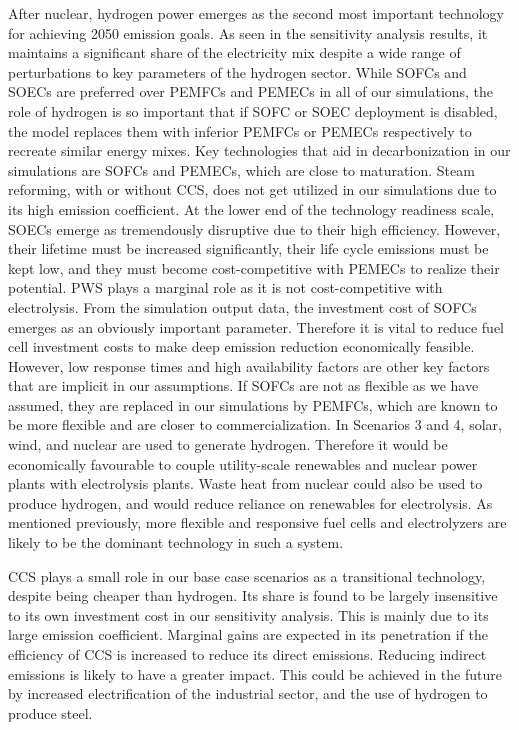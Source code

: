 After nuclear, hydrogen power emerges as the second most important technology for achieving 2050 emission goals. As seen in the sensitivity analysis results, it maintains a significant share of the electricity mix despite a wide range of perturbations to key parameters of the hydrogen sector. While \gls{SOFC}s and \gls{SOEC}s are preferred over \gls{PEMFC}s and \gls{PEMEC}s in all of our simulations, the role of hydrogen is so important that if \gls{SOFC} or \gls{SOEC} deployment is disabled, the model replaces them with inferior \gls{PEMFC}s or \gls{PEMEC}s respectively to recreate similar energy mixes. Key technologies that aid in decarbonization in our simulations are \gls{SOFC}s and \gls{PEMEC}s, which are close to maturation. Steam reforming, with or without CCS, does not get utilized in our simulations due to its high emission coefficient. At the lower end of the technology readiness scale, \gls{SOEC}s emerge as tremendously disruptive due to their high efficiency. However, their lifetime must be increased significantly, their life cycle emissions must be kept low, and they must become cost-competitive with \gls{PEMEC}s to realize their potential. \gls{PWS} plays a marginal role as it is not cost-competitive with electrolysis. From the simulation output data, the investment cost of \gls{SOFC}s emerges as an obviously important parameter. Therefore it is vital to reduce fuel cell investment costs to make deep emission reduction economically feasible. However, low response times and high availability factors are other key factors that are implicit in our assumptions. If \gls{SOFC}s are not as flexible as we have assumed, they are replaced in our simulations by \gls{PEMFC}s, which are known to be more flexible and are closer to commercialization. In Scenarios 3 and 4, solar, wind, and nuclear are used to generate hydrogen. Therefore it would be economically favourable to couple utility-scale renewables and nuclear power plants with electrolysis plants. Waste heat from nuclear could also be used to produce hydrogen, and would reduce reliance on renewables for electrolysis. As mentioned previously, more flexible and responsive fuel cells and electrolyzers are likely to be the dominant technology in such a system.

CCS plays a small role in our base case scenarios as a transitional technology, despite being cheaper than hydrogen. Its share is found to be largely insensitive to its own investment cost in our sensitivity analysis. This is mainly due to its large emission coefficient. Marginal gains are expected in its penetration if the efficiency of CCS is increased to reduce its direct emissions. Reducing indirect emissions is likely to have a greater impact. This could be achieved in the future by increased electrification of the industrial sector, and the use of hydrogen to produce steel.
